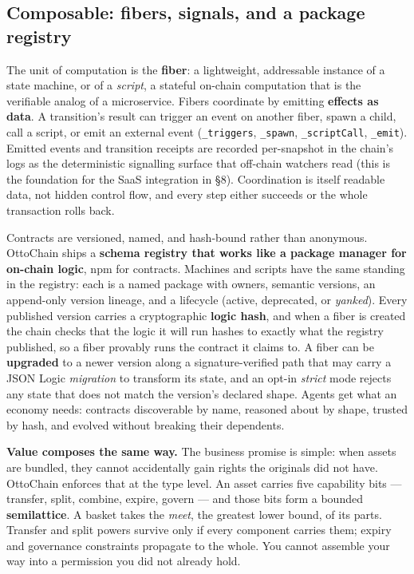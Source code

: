 \documentclass[11pt,a4paper]{article}
\begin{document}
\subsection{Composable: fibers, signals, and a package registry}

The unit of computation is the \textbf{fiber}: a lightweight, addressable instance of a state machine, or of a \emph{script}, a stateful on-chain computation that is the verifiable analog of a microservice. Fibers coordinate by emitting \textbf{effects as data}. A transition's result can trigger an event on another fiber, spawn a child, call a script, or emit an external event (\texttt{\_triggers}, \texttt{\_spawn}, \texttt{\_scriptCall}, \texttt{\_emit}). Emitted events and transition receipts are recorded per-snapshot in the chain's logs as the deterministic signalling surface that off-chain watchers read (this is the foundation for the SaaS integration in \S8). Coordination is itself readable data, not hidden control flow, and every step either succeeds or the whole transaction rolls back.

Contracts are versioned, named, and hash-bound rather than anonymous. OttoChain ships a \textbf{schema registry that works like a package manager for on-chain logic}, npm for contracts. Machines and scripts have the same standing in the registry: each is a named package with owners, semantic versions, an append-only version lineage, and a lifecycle (active, deprecated, or \emph{yanked}). Every published version carries a cryptographic \textbf{logic hash}, and when a fiber is created the chain checks that the logic it will run hashes to exactly what the registry published, so a fiber provably runs the contract it claims to. A fiber can be \textbf{upgraded} to a newer version along a signature-verified path that may carry a JSON Logic \emph{migration} to transform its state, and an opt-in \emph{strict} mode rejects any state that does not match the version's declared shape. Agents get what an economy needs: contracts discoverable by name, reasoned about by shape, trusted by hash, and evolved without breaking their dependents.

\textbf{Value composes the same way.} The business promise is simple: when assets are bundled, they cannot accidentally gain rights the originals did not have. OttoChain enforces that at the type level. An asset carries five capability bits --- transfer, split, combine, expire, govern --- and those bits form a bounded \textbf{semilattice}. A basket takes the \emph{meet}, the greatest lower bound, of its parts. Transfer and split powers survive only if every component carries them; expiry and governance constraints propagate to the whole. You cannot assemble your way into a permission you did not already hold.
\end{document}
